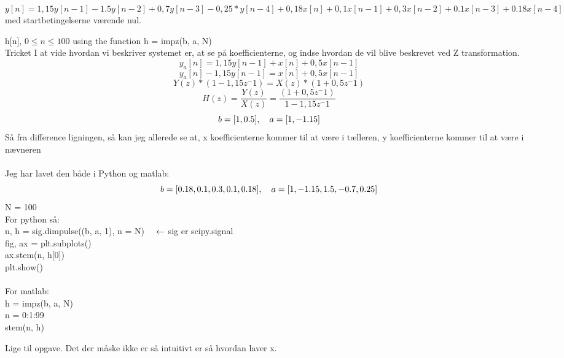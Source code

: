 \begin{Opgaver}
\begin{kapitel}
        \begin{Opgave}
            \[y[n] = 1,15y[n-1] - 1.5y[n-2] + 0,7y[n-3] - 0,25*y[n-4] + 0,18x[n] +0,1x[n-1] + 0,3x[n-2] + 0.1x[n-3] + 0.18x[n-4]\]
            med startbetingelserne værende nul. 
            \begin{UnderOpgave}
                h[n], \tab $0 \leq n \leq 100$ using the function h = impz(b, a, N)\\
                Tricket I at vide hvordan vi beskriver systemet er, at se på koefficienterne, og indse hvordan de vil blive beskrevet ved Z transformation.
                \[y_a[n] = 1,15y[n-1] + x[n] + 0,5x[n-1]\]
                \[y_a[n] - 1,15y[n-1] = x[n] + 0,5x[n-1]\]
                \[Y(z)*(1 - 1,15z^-1) = X(z) * (1 + 0,5z^-1)\]
                \[H(z) = \frac{Y(z)}{X(z)} = \frac{(1 + 0,5z^-1)}{1 - 1,15z^-1}\]
                \[b = [1, 0.5], \quad a = [1, -1.15]\]
                Så fra difference ligningen, så kan jeg allerede se at, x koefficienterne kommer til at være i tælleren, y koefficienterne kommer til at være i nævneren
                \\ \\ Jeg har lavet den både i Python og matlab: 
                \[b = [0.18, 0.1, 0.3, 0.1, 0.18],\quad a = [1, -1.15, 1.5, -0.7, 0.25]\]
                N = 100\\
                For python så:\\
                n, h = sig.dimpulse((b, a, 1), n = N) $\quad \leftarrow$ sig er scipy.signal\\ 
                fig, ax = plt.subplots()\\
                ax.stem(n, h[0])\\
                plt.show()\\
                \\
                For matlab: \\
                h = impz(b, a, N) \\
                n = 0:1:99\\
                stem(n, h)\\
            \end{UnderOpgave}
            \begin{UnderOpgave}[Beregn og plot output med \text{x[n] = u[n]}]
                Lige til opgave. Det der måske ikke er så intuitivt er så hvordan laver x. 

\end{UnderOpgave}
\end{Opgave}
\end{kapitel}
\end{Opgaver}
